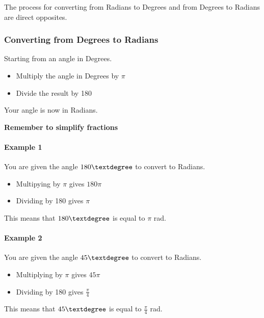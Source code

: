 \documentclass[
  12pt,
  a4paper, oneside]{starmastarticle}
\let\oldparagraph\paragraph
\renewcommand{\paragraph}[1]{\oldparagraph{#1}\mbox{}}
\providecommand{\tightlist}{%
  \setlength{\itemsep}{0pt}\setlength{\parskip}{0pt}}\usepackage{longtable,booktabs,array}
\begin{document}
The process for converting from Radians to Degrees and from Degrees to
Radians are direct opposites.

\hypertarget{converting-from-degrees-to-radians}{%
\subsubsection{Converting from Degrees to
Radians}\label{converting-from-degrees-to-radians}}

Starting from an angle in Degrees.

\begin{itemize}
\tightlist
\item
  Multiply the angle in Degrees by \(\pi\)
\item
  Divide the result by 180
\end{itemize}

Your angle is now in Radians.

\textbf{Remember to simplify fractions}

\hypertarget{example-1-1}{%
\paragraph{Example 1}\label{example-1-1}}

You are given the angle \(180\textdegree\) to convert to Radians.

\begin{itemize}
\tightlist
\item
  Multipying by \(\pi\) gives \(180\pi\)
\item
  Dividing by 180 gives \(\pi\)
\end{itemize}

This means that \(180\textdegree\) is equal to \(\pi\) rad.

\hypertarget{example-2-1}{%
\paragraph{Example 2}\label{example-2-1}}

You are given the angle \(45\textdegree\) to convert to Radians.

\begin{itemize}
\tightlist
\item
  Multiplying by \(\pi\) gives \(45\pi\)
\item
  Dividing by 180 gives \(\frac{\pi}{4}\)
\end{itemize}

This means that \(45\textdegree\) is equal to \(\frac{\pi}{4}\) rad.
\end{document}
